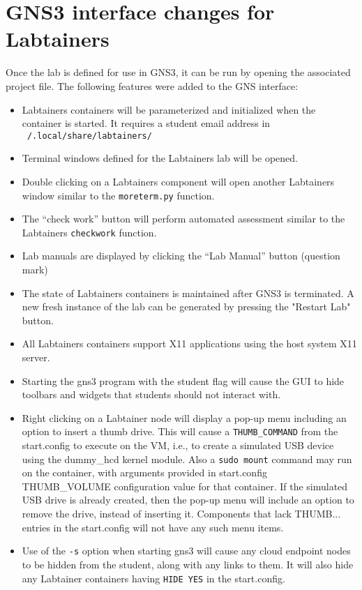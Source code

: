 \documentclass[12pt]{article}
\begin{document}
\section{GNS3 interface changes for Labtainers}
Once the lab is defined for use in GNS3, it can be run by opening the associated project file.  The following features were added to the GNS interface:
\begin{itemize}
	\item Labtainers containers will be parameterized and initialized when the container is started.  It requires a student email address in
		{\tt ~/.local/share/labtainers/}
	\item Terminal windows defined for the Labtainers lab will be opened.
	\item Double clicking on a Labtainers component will open another Labtainers window similar to the {\tt moreterm.py} function.
	\item The ``check work'' button will perform automated assessment similar to the Labtainers {\tt checkwork} function.
	\item Lab manuals are displayed by clicking the ``Lab Manual'' button (question mark)
	\item The state of Labtainers containers is maintained after GNS3 is terminated.  A new fresh instance of the lab can be generated
		by pressing the "Restart Lab" button.
	\item All Labtainers containers support X11 applications using the host system X11 server.
	\item Starting the gns3 program with the \-\-student flag will cause the GUI to hide toolbars and widgets that students should not interact with.
        \item Right clicking on a Labtainer node will display a pop-up menu including an option to insert a thumb drive.  This will cause
              a {\tt THUMB\_COMMAND} from the start.config to execute on the VM, i.e., to create a simulated USB device using the dummy\_hcd 
              kernel module.  Also a {\tt sudo mount} command may run on the container, with arguments provided in start.config THUMB\_VOLUME configuration
              value for that container.  If the simulated USB drive is already created, then the pop-up menu will include an option to remove the
              drive, instead of inserting it.  Components that lack THUMB... entries in the start.config will not have any such menu items.
        \item Use of the {\tt -s} option when starting gns3 will cause any cloud endpoint nodes to be hidden from the student,
along with any links to them.  It will also hide any Labtainer containers having {\tt HIDE YES} in the start.config.
\end{itemize}
\end{document}
